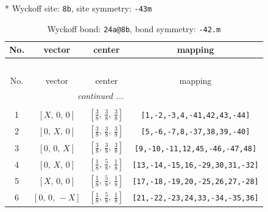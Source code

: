 \documentclass[fleqn,8pt]{jsarticle}
\begin{document}
* Wyckoff site: {\tt 8b}, site symmetry: {\tt -43m}
\renewcommand{\arraystretch}{1.2}
\begin{longtable}{cccc}
\caption{Wyckoff bond: {\tt 24a@8b}, bond symmetry: {\tt -42.m}}
 \\
 \hline \hline
No. & vector & center & mapping \\ \hline \endfirsthead

\multicolumn{3}{l}{\tablename\ \thetable{}} \\
 \hline \hline
No. & vector & center & mapping \\ \hline \endhead

 \hline \hline
\multicolumn{3}{r}{\footnotesize\it continued ...} \\ \endfoot

 \hline \hline
\multicolumn{3}{r}{} \\ \endlastfoot

1 & $\left[ X,\, 0,\, 0 \right]$ & $\left[ \frac{3}{8},\, \frac{3}{8},\, \frac{3}{8} \right]$ & {\tt [1,-2,-3,4,-41,42,43,-44]} \\ \hline
2 & $\left[ 0,\, X,\, 0 \right]$ & $\left[ \frac{3}{8},\, \frac{3}{8},\, \frac{3}{8} \right]$ & {\tt [5,-6,-7,8,-37,38,39,-40]} \\ \hline
3 & $\left[ 0,\, 0,\, X \right]$ & $\left[ \frac{3}{8},\, \frac{3}{8},\, \frac{3}{8} \right]$ & {\tt [9,-10,-11,12,45,-46,-47,48]} \\ \hline
4 & $\left[ 0,\, X,\, 0 \right]$ & $\left[ \frac{1}{8},\, \frac{5}{8},\, \frac{1}{8} \right]$ & {\tt [13,-14,-15,16,-29,30,31,-32]} \\ \hline
5 & $\left[ X,\, 0,\, 0 \right]$ & $\left[ \frac{1}{8},\, \frac{5}{8},\, \frac{1}{8} \right]$ & {\tt [17,-18,-19,20,-25,26,27,-28]} \\ \hline
6 & $\left[ 0,\, 0,\, - X \right]$ & $\left[ \frac{1}{8},\, \frac{5}{8},\, \frac{1}{8} \right]$ & {\tt [21,-22,-23,24,33,-34,-35,36]} \\
\end{longtable}
\renewcommand{\arraystretch}{1.2}
\end{document}

